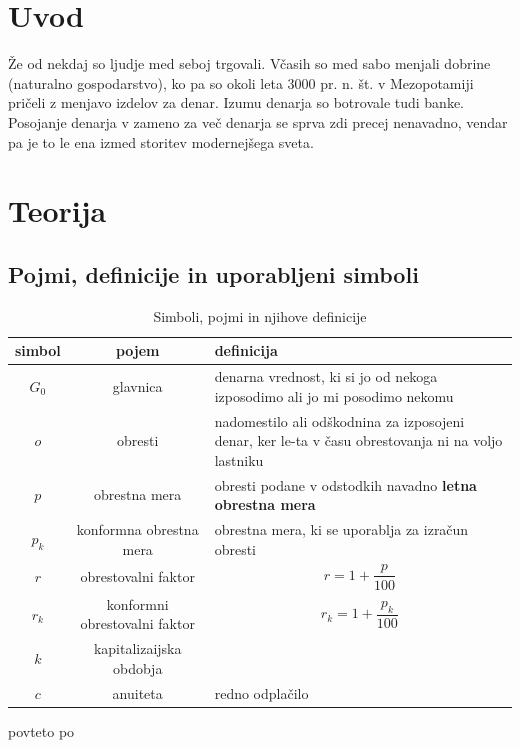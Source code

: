 \documentclass[12pt]{article}
\begin{document}
\newpage
\section{Uvod}
Že od nekdaj so ljudje med seboj trgovali. Včasih so med sabo menjali dobrine (naturalno gospodarstvo),
ko pa so okoli leta 3000 pr. n. št. v Mezopotamiji \cite{wiki:money} pričeli z menjavo izdelov za denar.
Izumu denarja so botrovale tudi banke. Posojanje denarja v zameno za več denarja se sprva zdi precej
nenavadno, vendar pa je to le ena izmed storitev modernejšega sveta. 



\section{Teorija}
    \subsection{Pojmi, definicije in uporabljeni simboli}
        \begin{table}[h!]
            \centering
            \begin{tabular}{|c|c|p{9cm}|}
                \hline
                \textbf{simbol} & \textbf{pojem} & \textbf{definicija} \\ \hline
                $G_0$ & glavnica & denarna vrednost, ki si jo od nekoga izposodimo ali jo mi posodimo nekomu \\ \hline 
                $o$ & obresti & nadomestilo ali odškodnina za izposojeni denar, ker le-ta v času obrestovanja ni na voljo lastniku \\ \hline
                $p$ & obrestna mera & obresti podane v odstodkih navadno \textbf{letna obrestna mera} \\ \hline
                $p_k$ & konformna obrestna mera & obrestna mera, ki se uporablja za izračun obresti \\ \hline
                $r$ & obrestovalni faktor & $$r = 1 + \frac{p}{100}$$ \\ \hline
                $r_k$ & konformni obrestovalni faktor & $$r_k = 1 + \frac{p_k}{100}$$ \\ \hline
                $k$ & kapitalizaijska obdobja & \\ \hline
                $c$ & anuiteta & redno odplačilo \\ \hline
            \end{tabular}

            \medskip
            \centering povteto po \cite{vega4}
            \caption{Simboli, pojmi in njihove definicije}
            \label{tab:simboli}
        \end{table}
\end{document}
